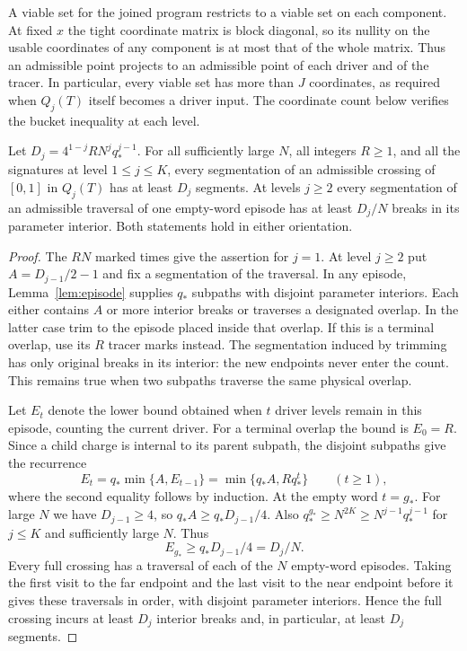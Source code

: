 A viable set for the joined program restricts to a viable set on each
component. At fixed $x$ the tight coordinate matrix is block diagonal,
so its nullity on the usable coordinates of any component is at most
that of the whole matrix. Thus an admissible point projects to an
admissible point of each driver and of the tracer. In particular, every
viable set has more than $J$ coordinates, as required when $Q_j(T)$
itself becomes a driver input. The coordinate count below verifies
the bucket inequality at each level.

\begin{proposition}\label{prop:iterated-crossing}
Let $D_j=4^{1-j}RN^jq_*^{j-1}$. For all sufficiently large $N$, all
integers $R\ge1$, and all the signatures at level $1\le j\le K$, every segmentation
of an admissible crossing of $[0,1]$ in $Q_j(T)$ has at least $D_j$
segments. At levels $j\ge2$ every segmentation of an admissible traversal
of one empty-word episode has at least $D_j/N$ breaks in its parameter
interior. Both statements hold in either orientation.
\end{proposition}
\begin{proof}
The $RN$ marked times give the assertion for $j=1$. At level $j\ge2$ put
$A=D_{j-1}/2-1$ and fix a segmentation of the traversal. In any episode,
Lemma~\ref{lem:episode} supplies $q_*$ subpaths with disjoint parameter
interiors. Each either contains $A$ or more interior breaks or traverses
a designated overlap. In the latter case trim to the episode placed
inside that overlap. If this is a terminal overlap, use its $R$ tracer
marks instead. The segmentation induced by trimming has only original
breaks in its interior: the new endpoints never enter the count. This
remains true when two subpaths traverse the same physical overlap.

Let $E_t$ denote the lower bound obtained when $t$ driver levels remain
in this episode, counting the current driver. For a terminal overlap the
bound is $E_0=R$. Since a child charge is internal to its parent subpath,
the disjoint subpaths give the recurrence
\[
 E_t=q_*\min\{A,E_{t-1}\}
       =\min\{q_* A,Rq_*^t\}\qquad(t\ge1),
\]
where the second equality follows by induction. At the empty word
$t=g_*$. For large $N$ we have $D_{j-1}\ge4$, so $q_* A\ge
q_*D_{j-1}/4$. Also $q_*^{g_*}\ge N^{2K}\ge N^{j-1}q_*^{j-1}$
for $j\le K$ and sufficiently large $N$. Thus
\[
                     E_{g_*}\ge q_*D_{j-1}/4=D_j/N .
\]
Every full crossing has a traversal of each of the $N$ empty-word
episodes. Taking the first visit to the far endpoint and the last visit
to the near endpoint before it gives these traversals in order,
with disjoint parameter interiors. Hence the full crossing incurs
at least $D_j$ interior breaks and, in particular, at least $D_j$
segments.
\end{proof}

